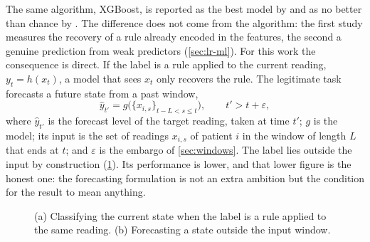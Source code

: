 The same algorithm, XGBoost, is reported as the best model by \textcite{efendi2025} and as no better than chance by \textcite{mendoza2025}. The difference does not come from the algorithm: the first study measures the recovery of a rule already encoded in the features, the second a genuine prediction from weak predictors (\cref{sec:lr-ml}). For this work the consequence is direct. If the label is a rule applied to the current reading, $y_t = h(x_t)$, a model that sees $x_t$ only recovers the rule. The legitimate task forecasts a future state from a past window,
\begin{equation}
  \hat{y}_{t'} = g\bigl(\{x_{i,s}\}_{t-L < s \leq t}\bigr), \qquad t' > t + \varepsilon,
\end{equation}
where $\hat{y}_{t'}$ is the forecast level of the target reading, taken at time $t'$; $g$ is the model; its input is the set of readings $x_{i,s}$ of patient $i$ in the window of length $L$ that ends at $t$; and $\varepsilon$ is the embargo of \cref{sec:windows}. The label lies outside the input by construction (\cref{fig:leak-vs-forecast}). Its performance is lower, and that lower figure is the honest one: the forecasting formulation is not an extra ambition but the condition for the result to mean anything.

\begin{figure}[htbp]
\centering
{}
\caption{(a) Classifying the current state when the label is a rule applied to the same reading. (b) Forecasting a state outside the input window.}\label{fig:leak-vs-forecast}
\end{figure}

